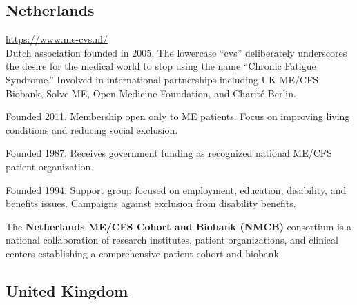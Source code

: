 \subsection{Netherlands}
\label{subsec:netherlands-orgs}

\begin{description}[style=nextline]
\item[ME/cvs Vereniging] \hfill \url{https://www.me-cvs.nl/}\\
Dutch association founded in 2005. The lowercase ``cvs'' deliberately underscores the desire for the medical world to stop using the name ``Chronic Fatigue Syndrome.'' Involved in international partnerships including UK ME/CFS Biobank, Solve ME, Open Medicine Foundation, and Charité Berlin.

\item[ME Vereniging Nederland] \hfill Founded 2011. Membership open only to ME patients. Focus on improving living conditions and reducing social exclusion.

\item[ME/CVS-Stichting Nederland] \hfill Founded 1987. Receives government funding as recognized national ME/CFS patient organization.

\item[Steungroep ME en Arbeidsongeschiktheid] \hfill Founded 1994. Support group focused on employment, education, disability, and benefits issues. Campaigns against exclusion from disability benefits.
\end{description}

The \textbf{Netherlands ME/CFS Cohort and Biobank (NMCB)} consortium is a national collaboration of research institutes, patient organizations, and clinical centers establishing a comprehensive patient cohort and biobank.

\subsection{United Kingdom}
\label{subsec:uk-orgs}

